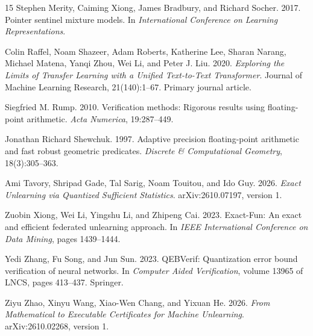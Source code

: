 \documentclass[11pt,a4paper]{article}
\def\href#1#2{{#2}}
\begin{document}
\begin{thebibliography}{15}
Stephen Merity, Caiming Xiong, James Bradbury, and Richard Socher. 2017.
\href{https://openreview.net/pdf?id=Byj72udxe}{Pointer sentinel mixture models}.
In \emph{International Conference on Learning Representations}.

Colin Raffel, Noam Shazeer, Adam Roberts, Katherine Lee, Sharan Narang,
Michael Matena, Yanqi Zhou, Wei Li, and Peter J. Liu.
2020. \emph{Exploring the Limits of Transfer Learning with a Unified Text-to-Text
Transformer}. Journal of Machine Learning Research, 21(140):1--67.
\href{https://jmlr.org/papers/v21/20-074.html}{Primary journal article}.

Siegfried M. Rump. 2010.
\href{https://www.tuhh.de/ti3/rump/intlab/ActaNumerica2010.pdf}{Verification methods: Rigorous results using floating-point arithmetic}.
\emph{Acta Numerica}, 19:287--449.

Jonathan Richard Shewchuk. 1997.
\href{https://people.eecs.berkeley.edu/~jrs/papers/robustr.pdf}{Adaptive precision floating-point arithmetic and fast robust geometric predicates}.
\emph{Discrete \& Computational Geometry}, 18(3):305--363.

Ami Tavory, Shripad Gade, Tal Sarig, Noam Touitou, and Ido Guy.
2026. \emph{Exact Unlearning via Quantized Sufficient Statistics}.
\href{https://arxiv.org/html/2610.07197v1}{arXiv:2610.07197, version 1}.

Zuobin Xiong, Wei Li, Yingshu Li, and Zhipeng Cai. 2023.
\href{https://doi.org/10.1109/ICDM58522.2023.00188}{Exact-Fun: An exact and efficient federated unlearning approach}.
In \emph{IEEE International Conference on Data Mining}, pages 1439--1444.

Yedi Zhang, Fu Song, and Jun Sun. 2023.
\href{https://doi.org/10.1007/978-3-031-37703-7_20}{QEBVerif: Quantization error bound verification of neural networks}.
In \emph{Computer Aided Verification}, volume 13965 of LNCS, pages 413--437. Springer.

Ziyu Zhao, Xinyu Wang, Xiao-Wen Chang, and Yixuan He.
2026. \emph{From Mathematical to Executable Certificates for Machine Unlearning}.
\href{https://arxiv.org/html/2610.02268v1}{arXiv:2610.02268, version 1}.
\end{thebibliography}
\end{document}
